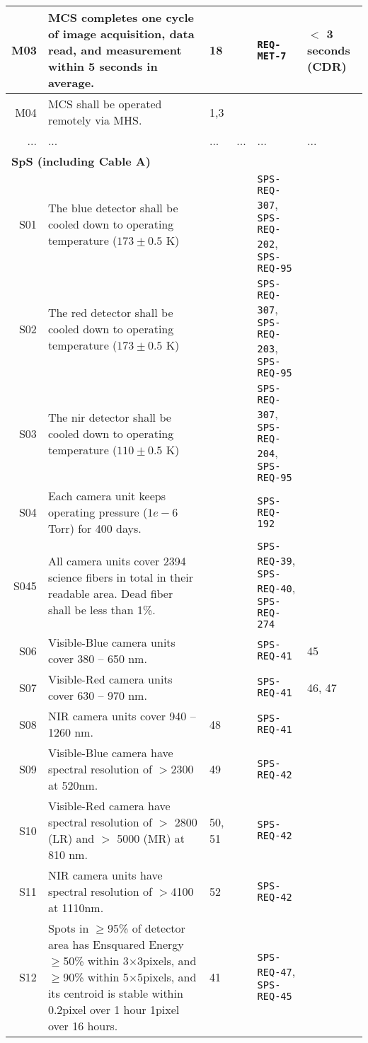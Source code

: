 \begin{landscape}
\begin{longtable}{r|p{80mm}|p{25mm}|c|p{30mm}|p{45mm}}
M03	& MCS completes one cycle of image acquisition, data read, and measurement within 5 seconds in average. 	& 18 	& 	& {\tt REQ-MET-7}	& $<$ 3 seconds (CDR) 	\\ \hline
M04	& MCS shall be operated remotely via MHS.	& 1,3	& 	& 	& 	\\ \hline
...	& ...	& ...	& ...	& ...	& ...	\\ \hline
\hline
\multicolumn{6}{l}{\hspace{5mm} {\bf SpS (including Cable A)}} \\ \hline
S01	& The blue detector shall be cooled down to operating temperature ($173 \pm 0.5$ K)	& 	& 	& {\tt SPS-REQ-307}, {\tt SPS-REQ-202}, {\tt SPS-REQ-95}	& 	\\ \hline
S02	& The red detector shall be cooled down to operating temperature ($173 \pm 0.5$ K)	& 	& 	& {\tt SPS-REQ-307}, {\tt SPS-REQ-203}, {\tt SPS-REQ-95}	& 	\\ \hline
S03	& The nir detector shall be cooled down to operating temperature ($110 \pm 0.5$ K)	& 	& 	& {\tt SPS-REQ-307}, {\tt SPS-REQ-204}, {\tt SPS-REQ-95}	& 	\\ \hline
S04	 & Each camera unit keeps operating pressure ($1e-6$ Torr) for 400 days.	& 	& 	& {\tt SPS-REQ-192}	& 	\\ \hline
S045 & All camera units cover 2394 science fibers in total in their readable area. Dead fiber shall be less than 1\%.	& 	& 	& {\tt SPS-REQ-39}, {\tt SPS-REQ-40}, {\tt SPS-REQ-274}	& 	\\ \hline
S06	 & Visible-Blue camera units cover 380 -- 650 nm.	&  	& 	& {\tt SPS-REQ-41}	& 45	\\ \hline
S07	 & Visible-Red camera units cover 630 -- 970 nm.	&  	& 	& {\tt SPS-REQ-41}	& 46, 47 	\\ \hline
S08	 & NIR camera units cover 940 -- 1260 nm.	& 48 	& 	& {\tt SPS-REQ-41}	& 	\\ \hline
S09 & Visible-Blue camera have spectral resolution of $>$2300 at 520nm.	& 49 	& 	& {\tt SPS-REQ-42}	& 	\\ \hline
S10	 & Visible-Red camera  have spectral resolution of  $>$ 2800 (LR) and $>$ 5000 (MR) at 810 nm.	& 50, 51  	& 	& {\tt SPS-REQ-42}	& 	\\ \hline
S11	 & NIR camera units have spectral resolution of $>$4100 at 1110nm.	& 52 	& 	& {\tt SPS-REQ-42}	& 	\\ \hline
S12	 & Spots in $\geq$95\% of detector area has Ensquared Energy $\geq$50\% within 3$\times$3pixels, and $\geq$90\% within 5$\times5$pixels, and its centroid is stable within 0.2pixel over 1 hour 1pixel over 16 hours.	& 41 	& 	& {\tt SPS-REQ-47}, {\tt SPS-REQ-45}	& 	\\ \hline

\end{longtable}
\end{landscape}
